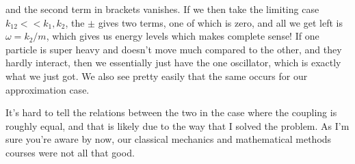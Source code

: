 and the second term in brackets vanishes. If we then take the limiting case $k_{12} << k_1,k_2$, the $\pm$ gives two terms, one of which is zero, and all we get left is $\omega = k_2/m$, which gives us energy levels which makes complete sense! If one particle is super heavy and doesn't move much compared to the other, and they hardly interact, then we essentially just have the one oscillator, which is exactly what we just got. We also see pretty easily that the same occurs for our approximation case.

It's hard to tell the relations between the two in the case where the coupling is roughly equal, and that is likely due to the way that I solved the problem. As I'm sure you're aware by now, our classical mechanics and mathematical methods courses were not all that good. 






